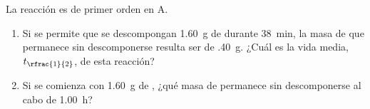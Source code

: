 La reacción  es de primer orden en A.
\begin{enumerate}[label={\alph*)},font={\color{red!50!black}\bfseries}]
	\item Si se permite que se descompongan \SI{1,60}{\gram} de  durante \SI{38}{\minute}, la masa de  que permanece sin descomponerse resulta ser de \SI{,40}{\gram}. ¿Cuál es la vida media, $t_{\rfrac{1}{2}}$, de esta reacción?
	\item Si se comienza con \SI{1,60}{\gram} de , ¿qué masa de  permanece sin descomponerse al cabo de \SI{1,00}{\hour}?
\end{enumerate}
